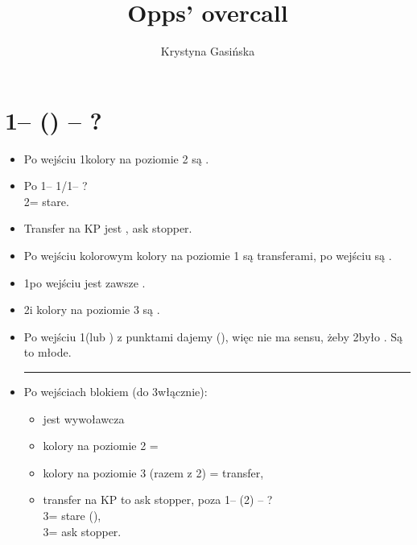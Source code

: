 \documentclass[12pt, a4paper]{article}
\title{Opps' overcall}
\author{Krystyna Gasińska}
\begin{document}
\maketitle

\section{1\clubs -- (\anysuit{\textbullet}) -- ?}
\begin{itemize}
    \item Po wejściu 1\nt kolory na poziomie 2 są \nf.
    \item Po 1\clubs -- 1\diams/1\nt -- ?\\
    2\clubs = stare.
    \item Transfer na KP jest \invp, ask stopper.
    \item Po wejściu kolorowym kolory na poziomie 1 są transferami, po wejściu \dbl są \nat.
    \item 1\nt po wejściu jest zawsze \nat.
    \item 2\nt i kolory na poziomie 3 są \inv.
    \item Po wejściu 1\nt (lub \dbl) z punktami dajemy \dbl (\rdbl), więc nie ma sensu,
    żeby 2\nt było \nat. Są to młode.\\
    \vspace{0.1cm}
    \hrule
    \item Po wejściach blokiem (do 3\diams włącznie):
    \begin{itemize}
        \item \dbl jest wywoławcza
        \item kolory na poziomie 2 = \nf
        \item kolory na poziomie 3 (razem z 2\nt) = transfer, \invp
        \item transfer na KP to ask stopper, poza
        1\clubs -- (2\diams) -- ?\\
        3\clubs = stare (\gf),\\
        3\spades = ask stopper.
    \end{itemize}
\end{itemize}
\end{document}
